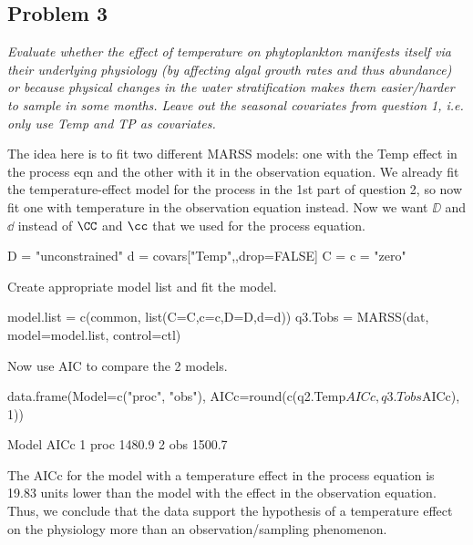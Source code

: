 \clearpage

\subsection*{Problem 3}
\textit{Evaluate whether the effect of temperature on phytoplankton manifests itself via their underlying physiology (by affecting algal growth rates and thus abundance) or because physical changes in the water stratification makes them easier/harder to sample in some months. Leave out the seasonal covariates from question 1, i.e. only use Temp and TP as covariates.}

\bigskip

The idea here is to fit two different MARSS models: one with the Temp effect
in the process eqn and the other with it in the observation equation.
We already fit the temperature-effect model for the process in the 1st part of question 2, so now fit one with temperature in the observation equation instead. Now we want $\DD$ and $\dd$ instead of $\CC$ and $\cc$ that we used for the process equation.
\begin{Schunk}
\begin{Sinput}
 D = "unconstrained"
 d = covars["Temp",,drop=FALSE]
 C = c = "zero"
\end{Sinput}
\end{Schunk}
Create appropriate model list and fit the model.
\begin{Schunk}
\begin{Sinput}
 model.list = c(common, list(C=C,c=c,D=D,d=d))
 q3.Tobs = MARSS(dat, model=model.list, control=ctl)
\end{Sinput}
\end{Schunk}
Now use AIC to compare the 2 models.
\begin{Schunk}
\begin{Sinput}
 data.frame(Model=c("proc", "obs"),
   	   AICc=round(c(q2.Temp$AICc, q3.Tobs$AICc), 1))
\end{Sinput}
\begin{Soutput}
  Model   AICc
1  proc 1480.9
2   obs 1500.7
\end{Soutput}
\end{Schunk}

The AICc for the model with a temperature effect in the process equation is
19.83 units lower than the model with the effect in the observation equation.
Thus, we conclude that the data support the hypothesis of a temperature
effect on the physiology more than an observation/sampling phenomenon.

